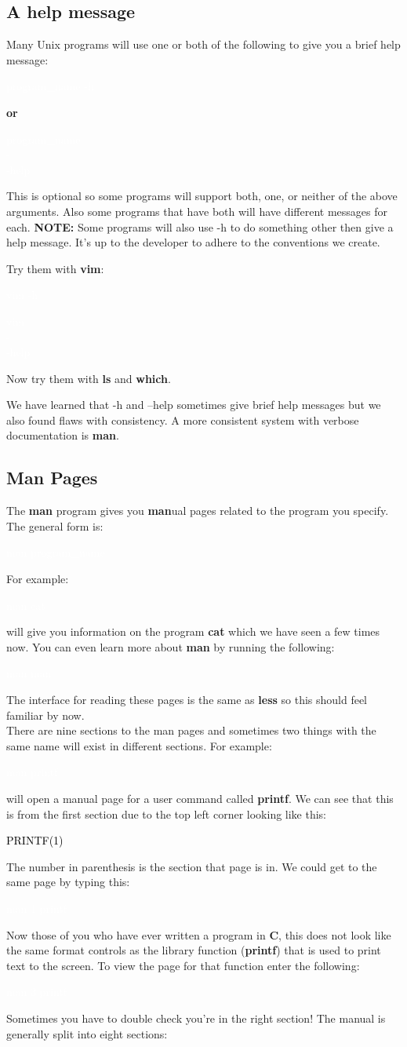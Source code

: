 \documentclass[oneside]{book}
\newcommand{\commandline}[1]{\begin{center} \colorbox{Dark}{\textcolor{white}{#1}} \end{center}}
\newcommand{\exampleout}[1]{\begin{center} \colorbox{Light}{\textcolor{black}{#1}} \end{center}}
\begin{document}
\subsection{ A help message}
Many Unix programs will use one or both of the following to give you a brief help message:
\commandline{program\_name -h}
\begin{center}
    \textbf{or}
\end{center}
\commandline{program\_name \ \\-\\-help}
This is optional so some programs will support both, one, or neither of the above arguments. Also some programs that have both will have different messages for each. \textbf{NOTE:} Some programs will also use -h to do something other then give a help message. It's up to the developer to adhere to the conventions we create.


Try them with \textbf{vim}:
	\commandline{vim -h}
	\commandline{vim \ \\-\\-help}
	Now try them with \textbf{ls} and \textbf{which}.

We have learned that -h and --help sometimes give brief help messages but we also found flaws with consistency. A more consistent system with verbose documentation is \textbf{man}.
\subsection{Man Pages}
The \textbf{man} program gives you \textbf{man}ual pages related to the program you specify. The general form is:
\commandline{man program\_name}
For example:
\commandline{man cat}
will give you information on the program \textbf{cat} which we have seen a few times now. You can even learn more about \textbf{man} by running the following:
\commandline{man man}
The interface for reading these pages is the same as \textbf{less} so this should feel familiar by now. \\

There are nine sections to the man pages and sometimes two things with the same name will exist in different sections. For example:
\commandline{man printf}
will open a manual page for a user command called \textbf{printf}. We can see that this is from the first section due to the top left corner looking like this:
\exampleout{PRINTF(1)}
The number in parenthesis is the section that page is in. We could get to the same page by typing this:
\commandline{man 1 printf}
Now those of you who have ever written a program in \textbf{C}, this does not look like the same format controls as the library function (\textbf{printf}) that is used to print text to the screen. To view the page for that function enter the following:
\commandline{man 3 printf}
Sometimes you have to double check you're in the right section! The manual is generally split into eight sections:
\end{document}
